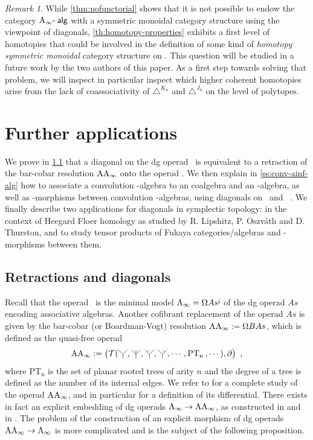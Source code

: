 \documentclass[twoside, 12pt]{amsart}
\theoremstyle{remark}
\newtheorem{remark}[definition]{\sc Remark}
\begin{document}
\begin{remark}
While \cref{thm:nofunctorial} shows that it is not possible to endow the category $\mathrm{A}_\infty\text{-\hspace{2pt}}\mathsf{alg}$ with a symmetric monoidal category structure using the viewpoint of diagonals, \cref{th:homotopy-properties} exhibits a first level of homotopies that could be involved in the definition of some kind of \textit{homotopy symmetric monoidal} category structure on \Aalg . 
This question will be studied in a future work by the two authors of this paper. As a first step towards solving that problem, we will inspect in particular inspect which higher coherent homotopies arise from the lack of coassociativity of $\triangle^{K_n}$ and $\triangle^{J_n}$ on the level of polytopes. 
\end{remark}


\section{Further applications} \label{sec:furtherdirections}

We prove in \cref{ss:retract-diag} that a diagonal on the dg operad \Ainf\ is equivalent to a retraction of the bar-cobar resolution $\mathrm{AA}_\infty$ onto the operad \Ainf . 
We then explain in \cref{ss:conv-ainf-alg} how to associate a convolution \Ainf -algebra to an \Ainf coalgebra and an \Ainf -algebra, as well as \Ainf -morphisms between convolution \Ainf -algebras, using diagonals on \Ainf\ and \Minf \ .
We finally describe two applications for diagonals in symplectic topology: in the context of Heegard Floer homology as studied by R. Lipshitz, P. Oszv\'ath and D. Thurston, and to study tensor products of Fukaya categories/algebras and \Ainf -morphisms between them.

\subsection{Retractions and diagonals} \label{ss:retract-diag}

Recall that the operad \Ainf\ is the minimal model $\mathrm{A}_\infty =\Omega As^{\text{!`}}$ of the dg operad $As$ encoding associative algebras. 
Another cofibrant replacement of the operad $As$ is given by the bar-cobar (or Boardman-Vogt) resolution $\mathrm{AA}_\infty := \Omega B As$, which is defined as the quasi-free operad 
\[ \AAinf := \left( \mathcal{T} (\premiertermecobarbarA , \premiertermecobarbarD , \premiertermecobarbarB , \premiertermecobarbarC , \cdots , \mathrm{PT_n} \text{\hspace{2pt}}, \cdots ) , \partial \right) \ , \] 
where $\mathrm{PT_n}$ is the set of planar rooted trees of arity $n$ and the degree of a tree is defined as the number of its internal edges.
We refer to \cite[Section 9.3]{LodayVallette12} for a complete study of the operad $\mathrm{AA}_\infty$, and in particular for a definition of its differential.
There exists in fact an explicit embedding of dg operads $\mathrm{A}_\infty \rightarrow \mathrm{AA}_\infty$, as constructed in \cite[Section 4]{MarklShnider06} and in \cite[I, Section 1.3.1.5]{Mazuir21}.
The problem of the construction of an explicit morphism of dg operads $\mathrm{AA}_\infty \rightarrow \mathrm{A}_\infty$ is more complicated and is the subject of the following proposition. 
\end{document}
